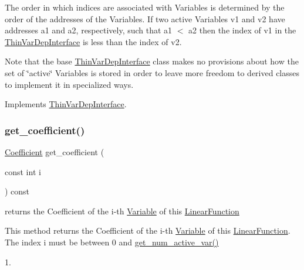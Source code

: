 The order in which indices are associated with Variables is determined by the order of the addresses of the Variables. If two active Variables v1 and v2 have addresses a1 and a2, respectively, such that a1 $<$ a2 then the index of v1 in the \mbox{\hyperlink{class_s_m_spp__di__unipi__it_1_1_thin_var_dep_interface}{Thin\+Var\+Dep\+Interface}} is less than the index of v2.

Note that the base \mbox{\hyperlink{class_s_m_spp__di__unipi__it_1_1_thin_var_dep_interface}{Thin\+Var\+Dep\+Interface}} class makes no provisions about how the set of \char`\"{}active\char`\"{} Variables is stored in order to leave more freedom to derived classes to implement it in specialized ways. 

Implements \mbox{\hyperlink{group___thin_var_dep_interface___c_l_a_s_s_e_s_ga1967518603f9424434460d4ba8676c37}{Thin\+Var\+Dep\+Interface}}.

\mbox{\label{class_s_m_spp__di__unipi__it_1_1_linear_function_a554e8ed3d718353810d4484d078e9199}} 
\subsubsection{\texorpdfstring{get\+\_\+coefficient()}{get\_coefficient()}}
{\footnotesize\ttfamily \mbox{\hyperlink{class_s_m_spp__di__unipi__it_1_1_linear_function_a1fa0f848dbb8d52dc62a1adfee1a1f90}{Coefficient}} get\+\_\+coefficient (\begin{DoxyParamCaption}\item[{const int}]{i }\end{DoxyParamCaption}) const\hspace{0.3cm}{\ttfamily [inline]}}



returns the Coefficient of the i-\/th \mbox{\hyperlink{class_s_m_spp__di__unipi__it_1_1_variable}{Variable}} of this \mbox{\hyperlink{class_s_m_spp__di__unipi__it_1_1_linear_function}{Linear\+Function}} 

This method returns the Coefficient of the i-\/th \mbox{\hyperlink{class_s_m_spp__di__unipi__it_1_1_variable}{Variable}} of this \mbox{\hyperlink{class_s_m_spp__di__unipi__it_1_1_linear_function}{Linear\+Function}}. The index i must be between 0 and \mbox{\hyperlink{class_s_m_spp__di__unipi__it_1_1_linear_function_a9e4e36559af1c5c8ecac72598b9fea4c}{get\+\_\+num\+\_\+active\+\_\+var()}}
\begin{DoxyItemize}
\item 1.
\end{DoxyItemize}


